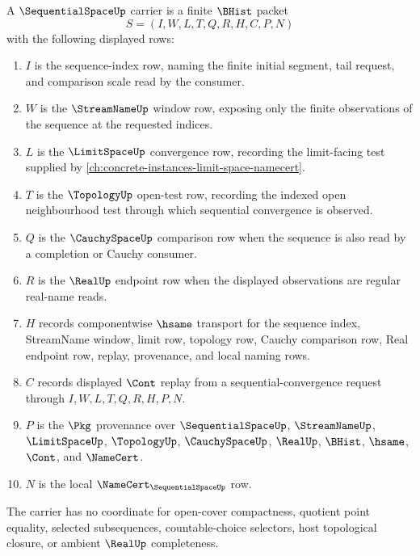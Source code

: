 \begin{definition}
\label{def:sequential-space-carrier}
A $\SequentialSpaceUp$ carrier is a finite $\BHist$ packet
$$
S=(I,W,L,T,Q,R,H,C,P,N)
$$
with the following displayed rows:
\begin{enumerate}
\item $I$ is the sequence-index row, naming the finite initial segment, tail request, and comparison scale read by the consumer.
\item $W$ is the $\StreamNameUp$ window row, exposing only the finite observations of the sequence at the requested indices.
\item $L$ is the $\LimitSpaceUp$ convergence row, recording the limit-facing test supplied by \autoref{ch:concrete-instances-limit-space-namecert}.
\item $T$ is the $\TopologyUp$ open-test row, recording the indexed open neighbourhood test through which sequential convergence is observed.
\item $Q$ is the $\CauchySpaceUp$ comparison row when the sequence is also read by a completion or Cauchy consumer.
\item $R$ is the $\RealUp$ endpoint row when the displayed observations are regular real-name reads.
\item $H$ records componentwise $\hsame$ transport for the sequence index, StreamName window, limit row, topology row, Cauchy comparison row, Real endpoint row, replay, provenance, and local naming rows.
\item $C$ records displayed $\Cont$ replay from a sequential-convergence request through $I,W,L,T,Q,R,H,P,N$.
\item $P$ is the $\Pkg$ provenance over $\SequentialSpaceUp$, $\StreamNameUp$, $\LimitSpaceUp$, $\TopologyUp$, $\CauchySpaceUp$, $\RealUp$, $\BHist$, $\hsame$, $\Cont$, and $\NameCert$.
\item $N$ is the local $\NameCert_{\SequentialSpaceUp}$ row.
\end{enumerate}
The carrier has no coordinate for open-cover compactness, quotient point equality, selected subsequences, countable-choice selectors, host topological closure, or ambient $\RealUp$ completeness.
\end{definition}

